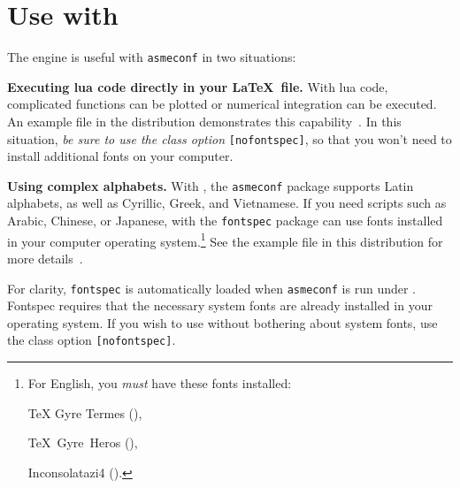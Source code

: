 \documentclass[captionpatch,colorlinks,upint,subscriptcorrection,varvw,mathalfa=cal=boondoxo,german]{asmeconf}
\begin{document}
\section[Use with LuaLaTeX]{Use with }\label{appendix:b}

The  engine is useful with \texttt{asmeconf} in two situations:

\begin{description}

\item \textbf{Executing lua code directly in your \LaTeX\ file.} With lua code, complicated functions can be plotted or numerical integration can be executed. An example file in the distribution demonstrates this capability~\cite{lienhard2024}. In this situation, \textit{be sure to use the class option} \texttt{[nofontspec]}, so that you won't need to install additional fonts on your computer. 

\item \textbf{Using complex alphabets.} With , the \texttt{asmeconf} package supports Latin alphabets, as well as Cyrillic, Greek, and Vietnamese. If you need scripts such as Arabic, Chinese, or Japanese,  with the \texttt{fontspec} package can use fonts installed in your computer operating system.\footnote{For English, you \textit{must} have these fonts installed:\par \parbox{\columnwidth}{\setlength{\parindent}{12pt}TeX Gyre Termes (),\par TeX~Gyre~Heros (),\par 
Inconsolatazi4 ().}} See the example file in this distribution for more details~\cite{lienhard2021}.


\end{description}


For clarity, \texttt{fontspec} is automatically loaded when \texttt{asmeconf} is run under . Fontspec requires that the necessary system fonts are already installed in your operating system.  If you wish to use  without bothering about system fonts, use the class option \texttt{[nofontspec]}. 
\end{document}
